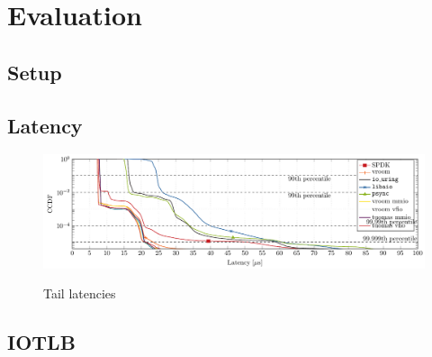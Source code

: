 \chapter{Evaluation}

\section{Setup}

\section{Latency}
\begin{figure}
    \centering
     {\includegraphics[width=\textwidth]{figures/latency-ccdf-write} \label{fig:ccdf-write}}
    \caption{Tail latencies}
    \label{fig:ccdf}
\end{figure}

\section{IOTLB}